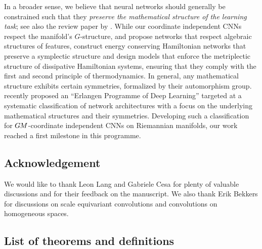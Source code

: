 In a broader sense, we believe that neural networks should generally be constrained such that they \emph{preserve the mathematical structure of the learning task};
see also the review paper by \cite{celledoni2020structure}.
While our coordinate independent CNNs respect the manifold's $G$-structure,
\citet{hoffmann2020algebranets} and \citet{alej2020algebraic} propose networks that respect algebraic structures of features,
\citet{greydanus2019hamiltonian} construct energy conserving Hamiltonian networks that preserve a symplectic structure
and \citet{hernandez2021structure} design models that enforce the metriplectic structure of dissipative Hamiltonian systems, ensuring that they comply with the first and second principle of thermodynamics.
In general, any mathematical structure exhibits certain symmetries, formalized by their automorphism group.
\citet{bronstein2021geometric5Gs} recently proposed an ``Erlangen Programme of Deep Learning''
targeted at a systematic classification of network architectures with a focus on the underlying mathematical structures and their symmetries.
Developing such a classification for $G\mkern-1.4muM$-coordinate independent CNNs on Riemannian manifolds,
our work reached a first milestone in this programme.






\subsection*{Acknowledgement}
We would like to thank Leon Lang and Gabriele Cesa for plenty of valuable discussions and for their feedback on the manuscript.
We also thank Erik Bekkers for discussions on scale equivariant convolutions and convolutions on homogeneous spaces.


\subsection*{List of theorems and definitions}
